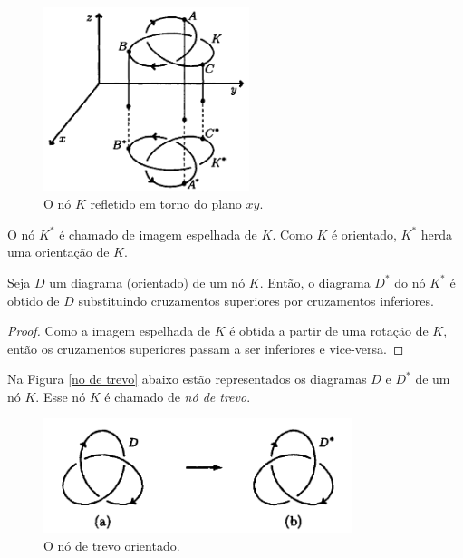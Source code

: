 	\begin{figure}[H]
		\begin{center}
			\includegraphics[width=6cm]{Images/no_espelhado.png}
		\end{center}\caption{O nó $K$ refletido em torno do plano $xy$.}\label{no espelhado}
	\end{figure}
	\par\vspace{0.3cm} O nó $K^\ast$ é chamado de imagem espelhada de $K$. Como $K$ é orientado, $K^\ast$ herda uma orientação de $K$.
	\begin{prop}
		\label{troca de cruzamentos}
		Seja $D$ um diagrama (orientado) de um nó $K$. Então, o diagrama $D^\ast$ do nó $K^\ast$ é obtido de $D$ substituindo cruzamentos superiores por cruzamentos inferiores.	
	\end{prop}
	\begin{proof}
		Como a imagem espelhada de $K$ é obtida a partir de uma rotação de $K$, então os cruzamentos superiores passam a ser inferiores e vice-versa.
	\end{proof}
	\par\vspace{0.3cm} Na Figura \eqref{no de trevo} abaixo estão representados os diagramas $D$ e $D^\ast$ de um nó $K$. Esse nó $K$ é chamado de \textit{nó de trevo}.
	
	\begin{figure}[H]
		\begin{center}
			\includegraphics[width=9cm]{Images/no_de_trevo.png}
		\end{center}\caption{O nó de trevo orientado.}
		\label{no de trevo}
	\end{figure} 
	
